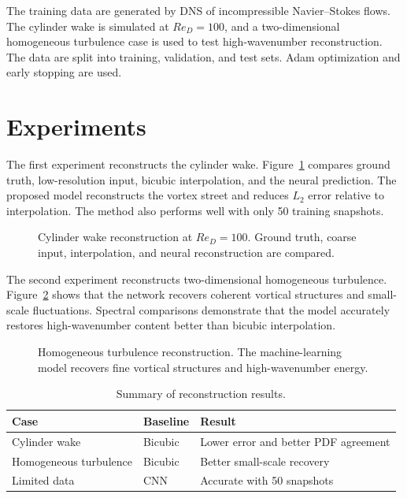 \documentclass[11pt]{article}
\begin{document}
The training data are generated by DNS of incompressible Navier--Stokes flows. The cylinder wake is simulated at $Re_D=100$, and a two-dimensional homogeneous turbulence case is used to test high-wavenumber reconstruction. The data are split into training, validation, and test sets. Adam optimization and early stopping are used.

\section{Experiments}
The first experiment reconstructs the cylinder wake. Figure~\ref{fig:cylinder} compares ground truth, low-resolution input, bicubic interpolation, and the neural prediction. The proposed model reconstructs the vortex street and reduces $L_2$ error relative to interpolation. The method also performs well with only 50 training snapshots.

\begin{figure}[h]
\centering
\fbox{\rule{0pt}{1.4in}\rule{0.9\linewidth}{0pt}}
\caption{Cylinder wake reconstruction at $Re_D=100$. Ground truth, coarse input, interpolation, and neural reconstruction are compared.}
\label{fig:cylinder}
\end{figure}

The second experiment reconstructs two-dimensional homogeneous turbulence. Figure~\ref{fig:turbulence} shows that the network recovers coherent vortical structures and small-scale fluctuations. Spectral comparisons demonstrate that the model accurately restores high-wavenumber content better than bicubic interpolation.

\begin{figure}[h]
\centering
\fbox{\rule{0pt}{1.4in}\rule{0.9\linewidth}{0pt}}
\caption{Homogeneous turbulence reconstruction. The machine-learning model recovers fine vortical structures and high-wavenumber energy.}
\label{fig:turbulence}
\end{figure}

\begin{table}[h]
\centering
\begin{tabular}{lll}
\toprule
Case & Baseline & Result \\
\midrule
Cylinder wake & Bicubic & Lower error and better PDF agreement \\
Homogeneous turbulence & Bicubic & Better small-scale recovery \\
Limited data & CNN & Accurate with 50 snapshots \\
\bottomrule
\end{tabular}
\caption{Summary of reconstruction results.}
\end{table}
\end{document}
